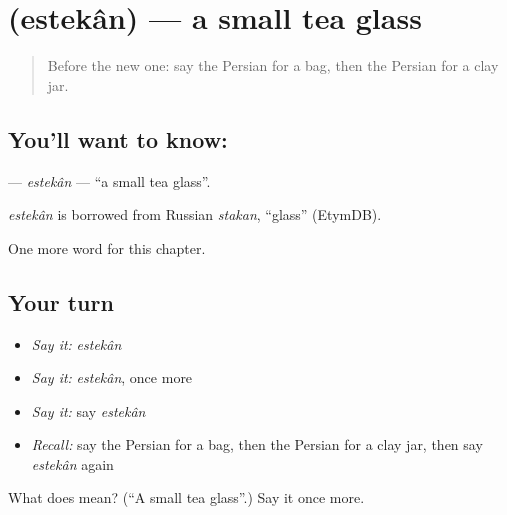 \section[\texorpdfstring{\fa{استکان} (estekân)}{استکان (estekân)}]{ (estekân) — a small tea glass}

\label{lesson:FA-C212-estekan}



\begin{quote}
Before the new one: say the Persian for a bag, then the Persian for a clay jar.
\end{quote}

\subsection*{You'll want to know: }
\textbf{} — \emph{estekân} — \textquotedblleft{}a small tea glass\textquotedblright{}.

\begin{cousinweb}
\emph{estekân} is borrowed from Russian \emph{stakan}, \textquotedblleft{}glass\textquotedblright{} (EtymDB).
\end{cousinweb}

\begin{grammarlens}[title={What you've built}]
One more word for this chapter.
\end{grammarlens}

\subsection*{Your turn}
\begin{itemize}
\raggedright
  \item \emph{Say it:} \emph{estekân}
  \item \emph{Say it:} \emph{estekân}, once more
  \item \emph{Say it:} say \emph{estekân}
  \item \emph{Recall:} say the Persian for a bag, then the Persian for a clay jar, then say \emph{estekân} again
\end{itemize}

\begin{tcolorbox}[breakable,colback=teal!4,colframe=teal!35!black,title={Before you move on}]
What does  mean? (\textquotedblleft{}A small tea glass\textquotedblright{}.) Say it once more.
\end{tcolorbox}
